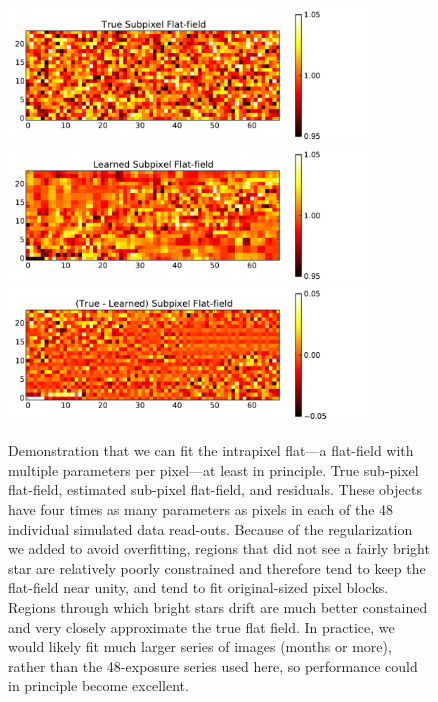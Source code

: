 \documentclass[letterpaper,12pt,whitepaper]{haastex}
\begin{document}
\begin{figure}
\includegraphics[width=0.85\textwidth]{sim2-201}
\includegraphics[width=0.85\textwidth]{sim2-202}
\includegraphics[width=0.85\textwidth]{sim2-203}
\caption{Demonstration that we can fit the intrapixel flat---a flat-field with multiple parameters per pixel---at least in principle.
True sub-pixel flat-field, estimated sub-pixel flat-field, and residuals.
  These objects have four times as many parameters as pixels in each of the 48 individual simulated data read-outs.
  Because of the regularization we added to avoid overfitting,
  regions that did not see a fairly bright star are relatively poorly constrained
  and therefore tend to keep the flat-field near unity, and tend to fit original-sized pixel blocks.
Regions through which bright stars drift are much better constained and very closely approximate the true flat field.
In practice, we would likely fit much larger series of images (months or more),
rather than the 48-exposure series used here, so performance could in principle become excellent.\label{fig:intrapixel}}
\end{figure}
\clearpage
\end{document}
